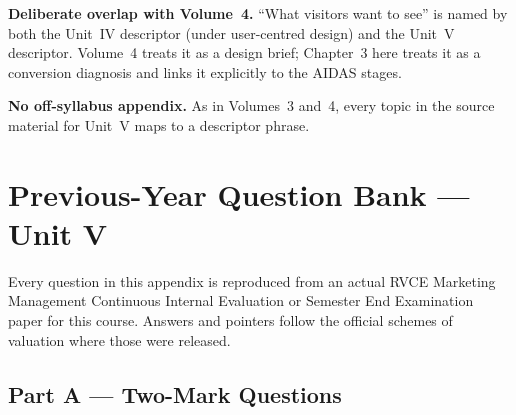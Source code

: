 \begin{keybox}
\textbf{Deliberate overlap with Volume~4.} ``What visitors want to see'' is named
by both the Unit~IV descriptor (under user-centred design) and the Unit~V
descriptor. Volume~4 treats it as a design brief; Chapter~3 here treats it as a
conversion diagnosis and links it explicitly to the AIDAS stages.

\smallskip
\textbf{No off-syllabus appendix.} As in Volumes~3 and~4, every topic in the
source material for Unit~V maps to a descriptor phrase.
\end{keybox}

\chapter{Previous-Year Question Bank --- Unit V}

Every question in this appendix is reproduced from an actual RVCE Marketing
Management Continuous Internal Evaluation or Semester End Examination paper for
this course. Answers and pointers follow the official schemes of valuation where
those were released.

\section*{Part A --- Two-Mark Questions}

